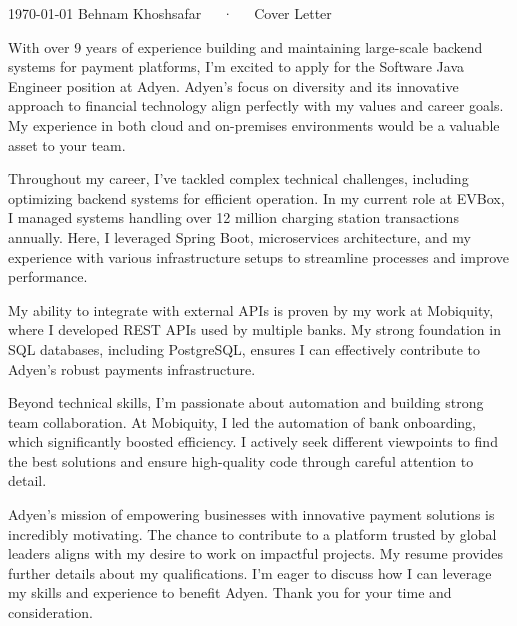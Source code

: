 \documentclass[11pt, a4paper]{awesome-cv}
\begin{document}
\makecvheader[C]

\makecvfooter
  {\today}
  {Behnam Khoshsafar~~~·~~~Cover Letter}
  {}

\makelettertitle

\begin{cvletter}

With over 9 years of experience building and maintaining large-scale backend systems for payment platforms, I'm excited to apply for the Software Java Engineer position at Adyen. Adyen's focus on diversity and its innovative approach to financial technology align perfectly with my values and career goals. My experience in both cloud and on-premises environments would be a valuable asset to your team.

Throughout my career, I've tackled complex technical challenges, including optimizing backend systems for efficient operation. In my current role at EVBox, I managed systems handling over 12 million charging station transactions annually. Here, I leveraged Spring Boot, microservices architecture, and my experience with various infrastructure setups to streamline processes and improve performance.

My ability to integrate with external APIs is proven by my work at Mobiquity, where I developed REST APIs used by multiple banks. My strong foundation in SQL databases, including PostgreSQL, ensures I can effectively contribute to Adyen's robust payments infrastructure.

Beyond technical skills, I'm passionate about automation and building strong team collaboration. At Mobiquity, I led the automation of bank onboarding, which significantly boosted efficiency. I actively seek different viewpoints to find the best solutions and ensure high-quality code through careful attention to detail.

Adyen's mission of empowering businesses with innovative payment solutions is incredibly motivating. The chance to contribute to a platform trusted by global leaders aligns with my desire to work on impactful projects.
My resume provides further details about my qualifications. I'm eager to discuss how I can leverage my skills and experience to benefit Adyen. Thank you for your time and consideration.

\end{cvletter}


\makeletterclosing
\end{document}
